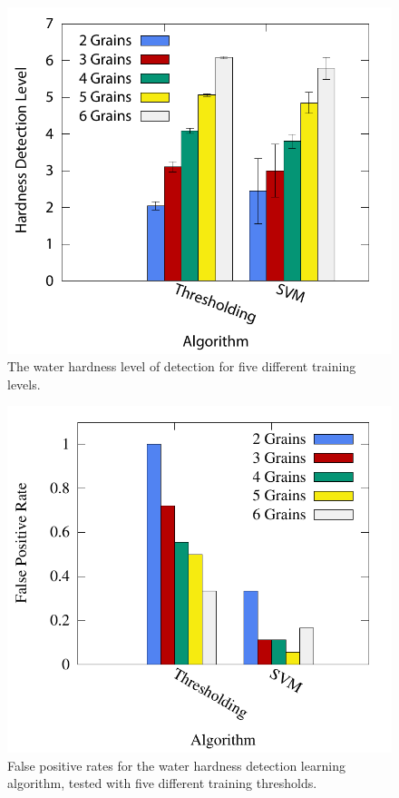 \begin{figure}[t]
\centering
\includegraphics{water/hardnessresults.pdf}
\caption{The water hardness level of detection for five different training levels.}
\label{fig:hardnessresults}
\end{figure}


\begin{figure}[t]
\centering
\includegraphics{water/hardnessfalsepositives.pdf}
\caption{False positive rates for the water hardness detection learning algorithm, tested with five different training thresholds.}
\label{fig:falsepositives}
\end{figure}

